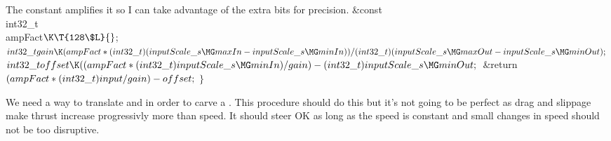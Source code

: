The constant  amplifies it so I can take advantage of the
extra
bits for precision.
\Y\B\&{const} \\{int32\_t}\\{ampFact}${}\K\T{128\$L}{}$;\7
${}\\{int32\_t}\\{gain}\K(\\{ampFact}*(\\{int32\_t})(\\{inputScale\_s}\MG%
\\{maxIn}-\\{inputScale\_s}\MG\\{minIn}))/(\\{int32\_t})(\\{inputScale\_s}\MG%
\\{maxOut}-\\{inputScale\_s}\MG\\{minOut});{}$\6
${}\\{int32\_t}\\{offset}\K((\\{ampFact}*(\\{int32\_t})\\{inputScale\_s}\MG%
\\{minIn})/\\{gain})-(\\{int32\_t})\\{inputScale\_s}\MG\\{minOut};{}$\6
\&{return} ${}(\\{ampFact}*(\\{int32\_t})\\{input}/\\{gain})-\\{offset};$ $%
\}{}$\par
\fi

We need a way to translate  and  in order to
carve a
. This procedure should do this but it's not going to be perfect
as
drag and slippage make thrust increase progressivly more than speed.
It should steer OK as long as the speed is constant and small changes in speed
should not be too disruptive.

